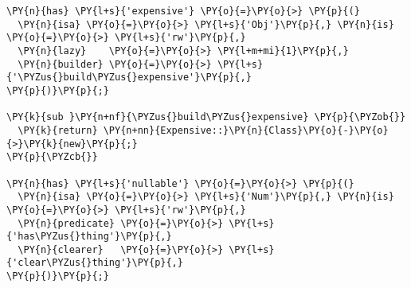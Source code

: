 \begin{Verbatim}[commandchars=\\\{\}]
\PY{n}{has} \PY{l+s}{'expensive'} \PY{o}{=}\PY{o}{>} \PY{p}{(} 
  \PY{n}{isa} \PY{o}{=}\PY{o}{>} \PY{l+s}{'Obj'}\PY{p}{,} \PY{n}{is} \PY{o}{=}\PY{o}{>} \PY{l+s}{'rw'}\PY{p}{,} 
  \PY{n}{lazy}    \PY{o}{=}\PY{o}{>} \PY{l+m+mi}{1}\PY{p}{,}
  \PY{n}{builder} \PY{o}{=}\PY{o}{>} \PY{l+s}{'\PYZus{}build\PYZus{}expensive'}\PY{p}{,}
\PY{p}{)}\PY{p}{;}

\PY{k}{sub }\PY{n+nf}{\PYZus{}build\PYZus{}expensive} \PY{p}{\PYZob{}}
  \PY{k}{return} \PY{n+nn}{Expensive::}\PY{n}{Class}\PY{o}{-}\PY{o}{>}\PY{k}{new}\PY{p}{;}
\PY{p}{\PYZcb{}}

\PY{n}{has} \PY{l+s}{'nullable'} \PY{o}{=}\PY{o}{>} \PY{p}{(} 
  \PY{n}{isa} \PY{o}{=}\PY{o}{>} \PY{l+s}{'Num'}\PY{p}{,} \PY{n}{is} \PY{o}{=}\PY{o}{>} \PY{l+s}{'rw'}\PY{p}{,} 
  \PY{n}{predicate} \PY{o}{=}\PY{o}{>} \PY{l+s}{'has\PYZus{}thing'}\PY{p}{,} 
  \PY{n}{clearer}   \PY{o}{=}\PY{o}{>} \PY{l+s}{'clear\PYZus{}thing'}\PY{p}{,}
\PY{p}{)}\PY{p}{;}
\end{Verbatim}
